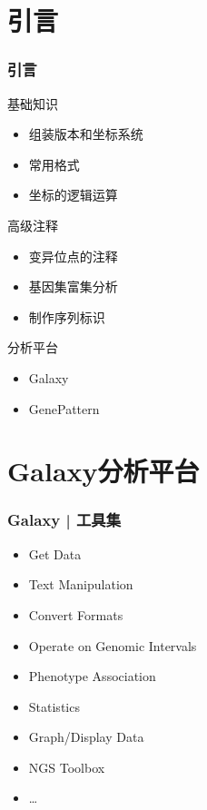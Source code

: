 \section{引言}
\begin{frame}
  \frametitle{引言}
  \begin{block}{基础知识}
    \begin{itemize}
      \item 组装版本和坐标系统
      \item 常用格式
      \item 坐标的逻辑运算
    \end{itemize}
  \end{block}
  \pause
  \begin{block}{高级注释}
    \begin{itemize}
      \item 变异位点的注释
      \item 基因集富集分析
      \item 制作序列标识
    \end{itemize}
  \end{block}
  \pause
  \begin{block}{分析平台}
    \begin{itemize}
      \item Galaxy
      \item GenePattern
    \end{itemize}
  \end{block}
\end{frame}

\section{Galaxy分析平台}
\begin{frame}
  \frametitle{Galaxy | 工具集}
  \begin{itemize}
    \item Get Data
    \item Text Manipulation
    \item Convert Formats
    \item Operate on Genomic Intervals
    \item Phenotype Association
    \item Statistics
    \item Graph/Display Data
    \item NGS Toolbox
    \item \ldots
  \end{itemize}
\end{frame}

